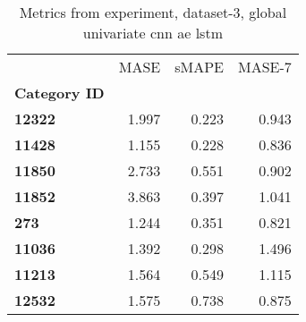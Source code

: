 \begin{table}[h]
\centering
\caption{Metrics from experiment, dataset-3, global univariate cnn ae lstm}
\label{table:global-univariate-cnn-ae-lstm-dataset-3}
\begin{tabular}{lrrr}
\toprule
{} &   MASE &  sMAPE &  MASE-7 \\
\textbf{Category ID} &        &        &         \\
\midrule
\textbf{12322      } &  1.997 &  0.223 &   0.943 \\
\textbf{11428      } &  1.155 &  0.228 &   0.836 \\
\textbf{11850      } &  2.733 &  0.551 &   0.902 \\
\textbf{11852      } &  3.863 &  0.397 &   1.041 \\
\textbf{273        } &  1.244 &  0.351 &   0.821 \\
\textbf{11036      } &  1.392 &  0.298 &   1.496 \\
\textbf{11213      } &  1.564 &  0.549 &   1.115 \\
\textbf{12532      } &  1.575 &  0.738 &   0.875 \\
\bottomrule
\end{tabular}
\end{table}
